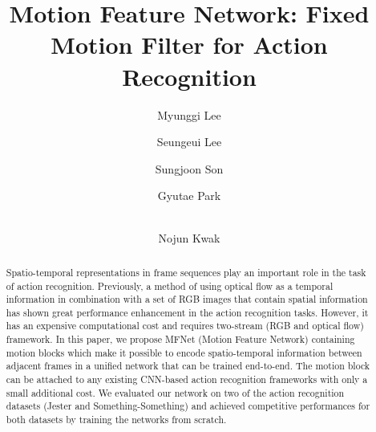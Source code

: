 \documentclass[runningheads]{llncs}
\begin{document}
\title{Motion Feature Network: Fixed Motion Filter for Action Recognition} 


\author{Myunggi Lee\and
Seungeui Lee\and
Sungjoon Son\and 
Gyutae Park\and \\ 
Nojun Kwak}


\maketitle              \begin{abstract}
Spatio-temporal representations in frame sequences play an important role in the task of action recognition. Previously, a method of using optical flow as a temporal information in combination with a set of RGB images that contain spatial information has shown great performance enhancement in the action recognition tasks. However, it has an expensive computational cost and requires two-stream (RGB and optical flow) framework. In this paper, we propose MFNet (Motion Feature Network) containing motion blocks which make it possible to encode spatio-temporal information between adjacent frames in a unified network that can be trained end-to-end. The motion block can be attached to any existing CNN-based action recognition frameworks with only a small additional cost. We evaluated our network on two of the action recognition datasets (Jester and Something-Something) and achieved competitive performances for both datasets by training the networks from scratch. 
\end{abstract}
\end{document}
